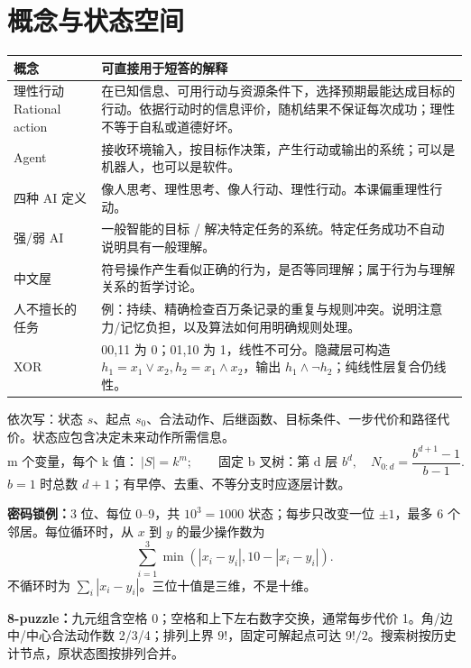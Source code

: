 \section{概念与状态空间}\label{sec:intro}
\par\noindent\begin{tabularx}{\textwidth}{p{}Y}
\toprule 概念 & 可直接用于短答的解释\\\midrule
理性行动 Rational action & 在已知信息、可用行动与资源条件下，选择预期最能达成目标的行动。依据行动时的信息评价，随机结果不保证每次成功；理性不等于自私或道德好坏。\\
Agent & 接收环境输入，按目标作决策，产生行动或输出的系统；可以是机器人，也可以是软件。\\
四种 AI 定义 & 像人思考、理性思考、像人行动、理性行动。本课偏重理性行动。\\
强/弱 AI & 一般智能的目标 / 解决特定任务的系统。特定任务成功不自动说明具有一般理解。\\
中文屋 & 符号操作产生看似正确的行为，是否等同理解；属于行为与理解关系的哲学讨论。\\
人不擅长的任务 & 例：持续、精确检查百万条记录的重复与规则冲突。说明注意力/记忆负担，以及算法如何用明确规则处理。\\
XOR & 00,11 为 0；01,10 为 1，线性不可分。隐藏层可构造 $h_1=x_1\lor x_2,h_2=x_1\land x_2$，输出 $h_1\land\neg h_2$；纯线性层复合仍线性。\\\bottomrule
\end{tabularx}\par

依次写：状态 $s$、起点 $s_0$、合法动作、后继函数、目标条件、一步代价和路径代价。状态应包含决定未来动作所需信息。
\[
\text{m 个变量，每个 k 值：}\ |S|=k^m;\qquad
\text{固定 b 叉树：第 d 层 }b^d,\quad
N_{0:d}=\frac{b^{d+1}-1}{b-1}.
\]
$b=1$ 时总数 $d+1$；有早停、去重、不等分支时应逐层计数。

\textbf{密码锁例：}3 位、每位 0--9，共 $10^3=1000$ 状态；每步只改变一位 $\pm1$，最多 6 个邻居。每位循环时，从 $x$ 到 $y$ 的最少操作数为
\[
\sum_{i=1}^3\min(|x_i-y_i|,10-|x_i-y_i|).
\]
不循环时为 $\sum_i|x_i-y_i|$。三位十值是三维，不是十维。

\textbf{8-puzzle：}九元组含空格 0；空格和上下左右数字交换，通常每步代价 1。角/边中/中心合法动作数 2/3/4；排列上界 $9!$，固定可解起点可达 $9!/2$。搜索树按历史计节点，原状态图按排列合并。

